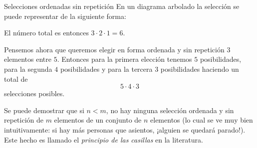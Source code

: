 \begin{section}{Selecciones ordenadas sin repetición}
En un diagrama arbolado la selección se puede representar de la siguiente forma:




El número total es entonces $3 \cdot 2 \cdot 1 = 6$.

Pensemos ahora que queremos elegir en forma ordenada y sin repetición $3$ elementos entre $5$. Entonces para la primera elección tenemos $5$ posibilidades, para la segunda $4$ posibilidades y para la tercera $3$ posibilidades haciendo un total de 
$$
5 \cdot 4 \cdot 3
$$
selecciones posibles. 


Se puede demostrar que si $n < m$, no hay ninguna selección ordenada y  sin repetición de $m$ elementos  de un conjunto de $n$ elementos (lo cual se ve muy bien intuitivamente: si hay más personas que asientos, ¡alguien se quedará parado!). Este hecho es llamado el {\em principio de las casillas} en la literatura.


\end{section}
